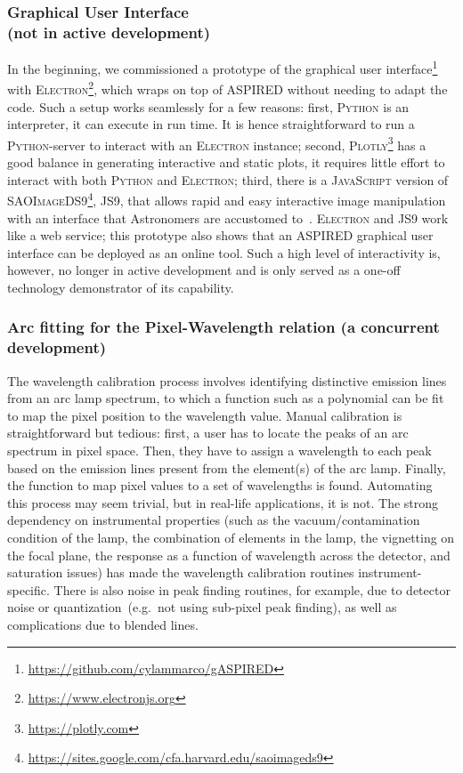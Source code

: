 \documentclass[linenumbers, twocolumn]{aastex631}
\begin{document}
\subsubsection*{Graphical User Interface\\(not in active development)}
In the beginning, we commissioned a prototype of the graphical user
interface\footnote{\url{https://github.com/cylammarco/gASPIRED}} with
\textsc{Electron}\footnote{\url{https://www.electronjs.org}}, which wraps on
top of \textsc{ASPIRED} without needing to adapt the code. Such a setup works seamlessly
for a few reasons: first, \textsc{Python} is an interpreter, it can
execute in run time. It is hence straightforward to run a \textsc{Python}-server to
interact with an \textsc{Electron} instance; second,
\textsc{Plotly}\footnote{\url{https://plotly.com}} has a good balance in
generating interactive and static plots, it requires little effort to interact
with both \textsc{Python} and \textsc{Electron}; third, there is a
\textsc{JavaScript} version of
\textsc{SAOImageDS9}\footnote{\url{https://sites.google.com/cfa.harvard.edu/saoimageds9}}, \textsc{JS9},
that allows rapid and easy interactive image manipulation with an interface
that Astronomers are accustomed to~\citep{2003ASPC..295..489J, eric_mandel_2022_6675771}.
\textsc{Electron} and \textsc{JS9} work like a web service; this prototype also
shows that an \textsc{ASPIRED} graphical user
interface can be deployed as an online tool. Such a high level of
interactivity is, however, no longer in active development and is only served
as a one-off technology demonstrator of its capability.

\subsubsection*{Arc fitting for the Pixel-Wavelength relation (a concurrent development)}

The wavelength calibration process involves identifying distinctive emission
lines from an arc lamp spectrum, to which a function such as a polynomial can be
fit to map the pixel position to the wavelength value. Manual calibration is
straightforward but tedious: first, a user has to locate the peaks of an arc
spectrum in pixel space. Then, they have to assign a wavelength to each peak
based on the emission lines present from the element(s) of the arc lamp.
Finally, the function to map pixel values to a set of wavelengths is found.
Automating this process may seem trivial, but in real-life applications, it is
not. The strong dependency on instrumental properties (such as the
vacuum/contamination condition of the lamp, the combination of elements in the
lamp, the vignetting on the focal plane, the response as a function of wavelength
across the detector, and saturation issues) has made the wavelength calibration
routines instrument-specific. There is also noise in peak finding routines, for
example, due to detector noise or quantization~(e.g.\ not using sub-pixel peak
finding), as well as complications due to blended lines.
\end{document}
